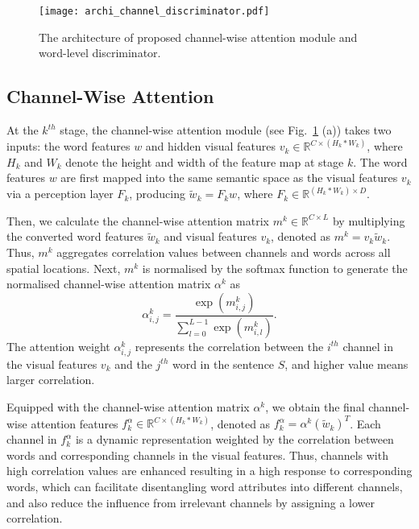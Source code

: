 \documentclass{article}
\begin{document}
\begin{figure}[t]
\centering
\begin{minipage}{1\textwidth}
\texttt{[image: archi\_channel\_discriminator.pdf]}
\end{minipage}
\caption{The architecture of proposed channel-wise attention module and word-level discriminator.}
\label{fig:archi_channel_dis}
\end{figure}

\subsection{Channel-Wise Attention}
\label{sec:channel-attention}
At the $k^{th}$ stage, the channel-wise attention module (see Fig.~\ref{fig:archi_channel_dis} (a)) takes two inputs: the word features $w$ and hidden visual features $v_{k} \in \mathbb{R}^{C \times (H_{k} \ast W_{k})}$, where $H_{k}$ and $W_{k}$ denote the height and width of the feature map at stage $k$. The word features $w$ are first mapped into the same semantic space as the visual features $v_{k}$ via a perception layer $F_{k}$, producing $\tilde{w}_{k}=F_{k}w$, where $F_{k} \in \mathbb{R}^{(H_{k} \ast W_{k}) \times D}$.

Then, we calculate the channel-wise attention matrix $m^{k} \in \mathbb{R}^{C \times L}$ by multiplying the converted word features $\tilde{w}_{k}$ and visual features $v_{k}$, denoted as $m^{k}=v_{k}\tilde{w}_{k}$. Thus, $m^{k}$ aggregates correlation values between channels and words across all spatial locations. Next, $m^{k}$ is normalised by the softmax function to generate the normalised channel-wise attention matrix $\alpha^{k}$ as
\begin{equation}
\alpha^{k}_{i,j}=\frac{\exp(m^{k}_{i,j})}{\sum^{L-1}_{l=0}\exp(m^{k}_{i,l})}
\textrm{.}
\label{eqn:corr}
\end{equation}
The attention weight $\alpha^{k}_{i,j}$ represents the correlation between the $i^{th}$ channel in the visual features $v_{k}$ and the $j^{th}$ word in the sentence $S$, and higher value means larger correlation.

Equipped with the channel-wise attention matrix $\alpha^k$, we obtain the final channel-wise attention features $f^{\alpha}_k \in \mathbb{R}^{C\times (H_k \ast W_k)}$, denoted as $f^{\alpha}_k=\alpha^k (\tilde{w}_k)^{T}$. 
Each channel in $f^{\alpha}_k$ is a dynamic representation weighted by the correlation between words and corresponding channels in the visual features.
Thus, channels with high correlation values are enhanced resulting in a high response to corresponding words, which can facilitate disentangling word attributes into different channels, and also reduce the influence from irrelevant channels by assigning a lower correlation.
\end{document}
